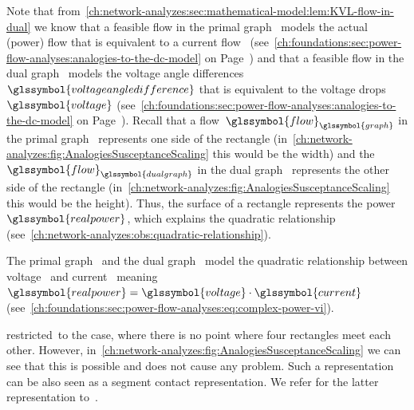 Note that
from~\cref{ch:network-analyzes:sec:mathematical-model:lem:KVL-flow-in-dual} we
know that a feasible flow in the primal graph~ models the
actual (power) flow that is equivalent to a current flow~
(see~\cref{ch:foundations:sec:power-flow-analyses:analogies-to-the-dc-model} on
Page~\pageref{ch:foundations:sec:power-flow-analyses:analogies-to-the-dc-model})
and that a feasible flow in the dual graph~ models the
voltage angle differences~$\glssymbol{voltageangledifference}$ that is
equivalent to the voltage drops~$\glssymbol{voltage}$
(see~\cref{ch:foundations:sec:power-flow-analyses:analogies-to-the-dc-model} on
Page~\pageref{ch:foundations:sec:power-flow-analyses:analogies-to-the-dc-model}).
Recall that a flow~$
\glssymbol{flow}_{\glssymbol{graph}}$ in the primal
graph~ represents one side of the rectangle
(in~\cref{ch:network-analyzes:fig:AnalogiesSusceptanceScaling} this
would be the width) and the~$\glssymbol{flow}_{\glssymbol{dualgraph}}$ in the
dual graph~ represents the other side of the rectangle
(in~\cref{ch:network-analyzes:fig:AnalogiesSusceptanceScaling} this
would be the height). Thus, the surface of a rectangle represents the
power~$\glssymbol{realpower}$, which explains the quadratic relationship
(see~\cref{ch:network-analyzes:obs:quadratic-relationship}).
%
\begin{lemma}
    The primal graph~ and the dual graph~
    model the quadratic relationship between voltage~
    and current~ meaning~$\glssymbol{realpower} =
    \glssymbol{voltage}\cdot\glssymbol{current}$
    (see~\cref{ch:foundations:sec:power-flow-analyses:eq:complex-power-vi}).
    \label{ch:network-analyzes:obs:quadratic-relationship}
\end{lemma}
% 
\textcite[p.8]{Fel13} restricted~\rectangulardissection to the case, where there
is no point where four rectangles meet each other. However,
in~\cref{ch:network-analyzes:fig:AnalogiesSusceptanceScaling} we can
see that this is possible and does not cause any problem. Such a representation
can be also seen as a segment contact representation. We refer for the latter
representation to~\textcite{Fel13}.
% 

